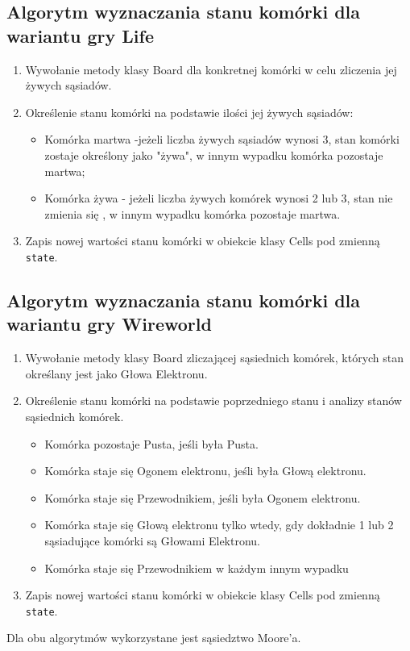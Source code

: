 \documentclass[10pt, oneside]{article}
\begin{document}
\subsection{ Algorytm wyznaczania stanu komórki dla wariantu gry Life}
	\begin {enumerate}
	\item Wywołanie metody klasy Board dla konkretnej komórki w celu zliczenia jej żywych sąsiadów.
	\item Określenie stanu komórki na podstawie ilości jej żywych sąsiadów:
		\begin{itemize}
		\item Komórka martwa -jeżeli  liczba żywych sąsiadów wynosi 3, stan komórki zostaje określony jako "żywa", w innym wypadku komórka pozostaje martwa;
		\item Komórka żywa - jeżeli liczba żywych komórek wynosi 2 lub 3, stan nie zmienia się , w innym wypadku komórka pozostaje martwa.
		\end{itemize}
	\item Zapis nowej wartości stanu komórki w obiekcie klasy Cells pod zmienną \texttt{state}.
	\end {enumerate}


\subsection{ Algorytm wyznaczania stanu komórki dla wariantu gry Wireworld}
	\begin {enumerate}
		\item Wywołanie metody klasy Board zliczającej sąsiednich komórek, których stan określany jest jako Głowa Elektronu. 
		\item Określenie stanu komórki na podstawie poprzedniego stanu i analizy stanów sąsiednich komórek.
		\begin{itemize}
		\item Komórka pozostaje Pusta, jeśli była Pusta.
		\item Komórka staje się Ogonem elektronu, jeśli była Głową elektronu.
		\item Komórka staje się Przewodnikiem, jeśli była Ogonem elektronu.
		\item Komórka staje się Głową elektronu tylko wtedy, gdy dokładnie 1 lub 2 sąsiadujące komórki są Głowami Elektronu.
		\item Komórka staje się Przewodnikiem w każdym innym wypadku
	\end{itemize}
	\item Zapis nowej wartości stanu komórki w obiekcie klasy Cells pod zmienną \texttt{state}.
	
\end {enumerate}
Dla obu algorytmów wykorzystane jest sąsiedztwo Moore'a. 
\end{document}
